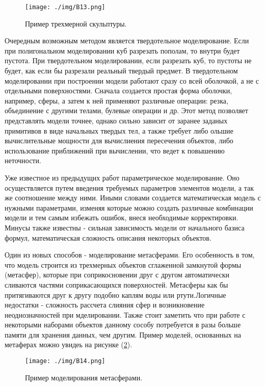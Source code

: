\begin{figure} 
\begin{center}
\texttt{[image: ./img/B13.png]}
\end{center}
\caption{Пример трехмерной скульптуры.}
\label{pic:B13}
\end{figure}

Очередным возможным методом является твердотельное моделирование. Если при полигональном моделировании куб разрезать пополам, то внутри будет пустота. При твердотельном моделировании, если разрезать куб, то  пустоты не будет, как если бы разрезали реальный твердый предмет. В твердотельном моделировании при построении модели работают сразу со всей оболочкой, а не с отдельными поверхностями. Сначала создается простая форма оболочки, например, сферы, а затем к ней применяют различные операции: резка, объединение с другими телами, булевые операции и др. Этот метод позволяет представлять модели точнее, однако сильно зависит от заранее заданых примитивов в виде начальных твердых тел, а также требует либо ольшие вычислительные мощности для вычислиения пересечения объектов, либо использование приближений при вычислении, что ведет к повышению неточности. 

Уже известное из предыдущих работ параметрическое моделирование. Оно осуществляется путем введения требуемых параметров элементов модели, а так же соотношение между ними. Иными словами создается математическая модель с нужными параметрами, изменяя которые можно создать различные комбинации модели и тем самым избежать ошибок, внеся необходимые корректировки. Минусы также известны - сильная зависимость модели от начального базиса формул, математическая сложность описания некоторых объектов.

Один из новых способов - моделирование метасферами. Его особенность в том, что модель строится из трехмерных объектов сглаженной замкнутой формы (метасфер), которые при соприкосновении друг с другом автоматически сливаются частями соприкасающихся поверхностей. Метасферы как бы притягиваются друг к другу подобно каплям воды или ртути.Логичные недостатки - сложность рассчета слияния сфер и возникновение неоднозначностей при мделировании. Также стоит заметить что при работе с некоторыми наборами объектов данному сособу потребуется в разы больше памяти для хранения данных, чем другим. Пример моделей, основанных на метаферах можно увидеь на рисунке (\ref{pic:B14}).

\begin{figure} 
\begin{center}
\texttt{[image: ./img/B14.png]}
\end{center}
\caption{Пример моделирования метасферами.}
\label{pic:B14}
\end{figure}

